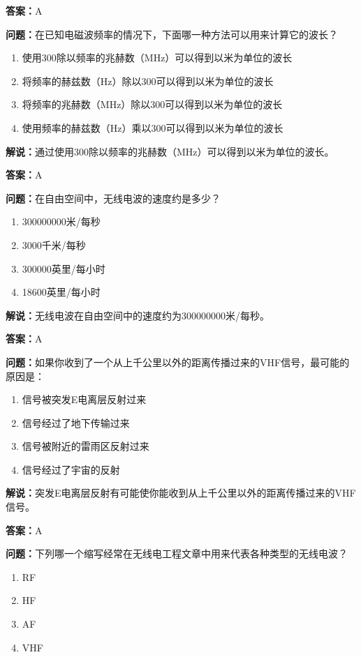 \textbf{答案：}A

\textbf{问题：}在已知电磁波频率的情况下，下面哪一种方法可以用来计算它的波长？

\begin{enumerate}[label=\Alph*), leftmargin=3em]
	\item 使用300除以频率的兆赫数（MHz）可以得到以米为单位的波长
	\item 将频率的赫兹数（Hz）除以300可以得到以米为单位的波长
	\item 将频率的兆赫数（MHz）除以300可以得到以米为单位的波长
	\item 使用频率的赫兹数（Hz）乘以300可以得到以米为单位的波长
\end{enumerate}

\textbf{解说：}通过使用300除以频率的兆赫数（MHz）可以得到以米为单位的波长。

\textbf{答案：}A

\textbf{问题：}在自由空间中，无线电波的速度约是多少？

\begin{enumerate}[label=\Alph*), leftmargin=3em]
	\item 300000000米/每秒
	\item 3000千米/每秒
	\item 300000英里/每小时
	\item 18600英里/每小时
\end{enumerate}

\textbf{解说：}无线电波在自由空间中的速度约为300000000米/每秒。

\textbf{答案：}A

\textbf{问题：}如果你收到了一个从上千公里以外的距离传播过来的VHF信号，最可能的原因是：

\begin{enumerate}[label=\Alph*), leftmargin=3em]
	\item 信号被突发E电离层反射过来
	\item 信号经过了地下传输过来
	\item 信号被附近的雷雨区反射过来
	\item 信号经过了宇宙的反射
\end{enumerate}

\textbf{解说：}突发E电离层反射有可能使你能收到从上千公里以外的距离传播过来的VHF信号。

\textbf{答案：}A

\textbf{问题：}下列哪一个缩写经常在无线电工程文章中用来代表各种类型的无线电波？

\begin{enumerate}[label=\Alph*), leftmargin=3em]
	\item RF
	\item HF
	\item AF
	\item VHF
\end{enumerate}

